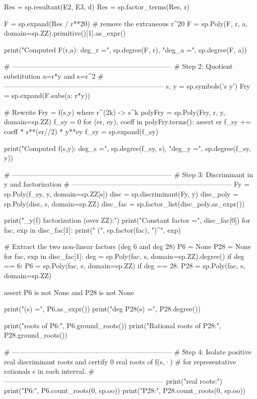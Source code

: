 \documentclass[12pt]{article}
\theoremstyle{remark}
\theoremstyle{definition}
\begin{document}
\begin{code}
Res = sp.resultant(E2, E3, d)
Res = sp.factor_terms(Res, r)

F = sp.expand(Res / r**20)  # remove the extraneous r^20
F = sp.Poly(F, r, a, domain=sp.ZZ).primitive()[1].as_expr()

print("Computed F(r,a): deg_r =", sp.degree(F, r), "deg_a =", sp.degree(F, a))

# ---------------------------------------------------------------------
# Step 2: Quotient substitution a=r*y and s=r^2
# ---------------------------------------------------------------------
s, y = sp.symbols('s y')
Fry = sp.expand(F.subs({a: r*y}))

# Rewrite Fry = f(s,y) where r^(2k) -> s^k
polyFry = sp.Poly(Fry, r, y, domain=sp.ZZ)
f_sy = 0
for (er, ey), coeff in polyFry.terms():
    assert er %
    f_sy += coeff * s**(er//2) * y**ey
f_sy = sp.expand(f_sy)

print("Computed f(s,y): deg_s =", sp.degree(f_sy, s), "deg_y =", sp.degree(f_sy, y))

# ---------------------------------------------------------------------
# Step 3: Discriminant in y and factorization
# ---------------------------------------------------------------------
Fy = sp.Poly(f_sy, y, domain=sp.ZZ[s])
disc = sp.discriminant(Fy, y)
disc_poly = sp.Poly(disc, s, domain=sp.ZZ)
disc_fac = sp.factor_list(disc_poly.as_expr())

print("\nDisc_y(f) factorization (over ZZ):")
print("Constant factor =", disc_fac[0])
for fac, exp in disc_fac[1]:
    print("  (", sp.factor(fac), ")^", exp)

# Extract the two non-linear factors (deg 6 and deg 28)
P6 = None
P28 = None
for fac, exp in disc_fac[1]:
    deg = sp.Poly(fac, s, domain=sp.ZZ).degree()
    if deg == 6:
        P6 = sp.Poly(fac, s, domain=sp.ZZ)
    if deg == 28:
        P28 = sp.Poly(fac, s, domain=sp.ZZ)

assert P6 is not None and P28 is not None

print("(s) =", P6.as_expr())
print("deg P28(s) =", P28.degree())

print("\nRational roots of P6:", P6.ground_roots())
print("Rational roots of P28:", P28.ground_roots())

# ---------------------------------------------------------------------
# Step 4: Isolate positive real discriminant roots and certify 0 real roots of f(s,·)
# for representative rationals s in each interval.
# ---------------------------------------------------------------------
print("\nPositive real roots:")
print("P6:", P6.count_roots(0, sp.oo))
print("P28:", P28.count_roots(0, sp.oo))


\end{code}
\end{document}
